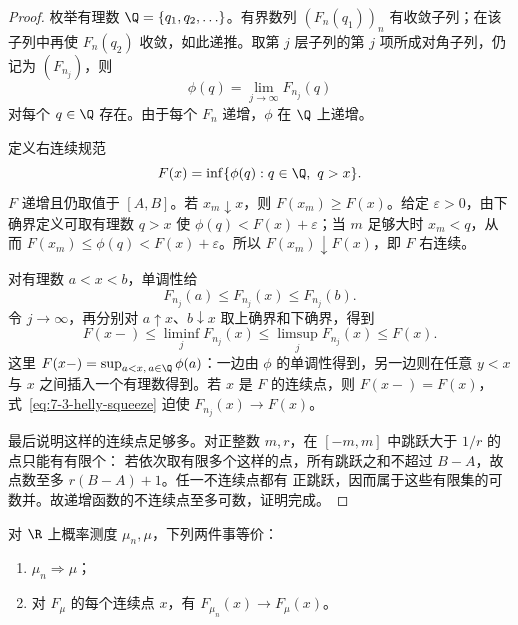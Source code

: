 \begin{proof}
枚举有理数 $\Q=\{q_1,q_2,\ldots\}$。有界数列 $(F_n(q_1))_n$ 有收敛子列；在该子列中再使
$F_n(q_2)$ 收敛，如此递推。取第 $j$ 层子列的第 $j$ 项所成对角子列，仍记为 $(F_{n_j})$，则
\[
 \phi(q)=\lim_{j\to\infty}F_{n_j}(q)
\]
对每个 $q\in\Q$ 存在。由于每个 $F_n$ 递增，$\phi$ 在 $\Q$ 上递增。

定义右连续规范
\begin{equation}\label{eq:7-3-helly-limit-definition}
 F(x)=\inf\{\phi(q):q\in\Q,\ q>x\}.
\end{equation}
$F$ 递增且仍取值于 $[A,B]$。若 $x_m\downarrow x$，则 $F(x_m)\geq F(x)$。给定
$\varepsilon>0$，由下确界定义可取有理数 $q>x$ 使
$\phi(q)<F(x)+\varepsilon$；当 $m$ 足够大时 $x_m<q$，从而
$F(x_m)\leq\phi(q)<F(x)+\varepsilon$。所以 $F(x_m)\downarrow F(x)$，即 $F$ 右连续。

对有理数 $a<x<b$，单调性给
\[
 F_{n_j}(a)\leq F_{n_j}(x)\leq F_{n_j}(b).
\]
令 $j\to\infty$，再分别对 $a\uparrow x$、$b\downarrow x$ 取上确界和下确界，得到
\begin{equation}\label{eq:7-3-helly-squeeze}
 F(x-)\leq\liminf_jF_{n_j}(x)
 \leq\limsup_jF_{n_j}(x)\leq F(x).
\end{equation}
这里
$F(x-)=\sup_{a<x,\,a\in\Q}\phi(a)$：一边由 $\phi$ 的单调性得到，另一边则在任意 $y<x$ 与
$x$ 之间插入一个有理数得到。若 $x$ 是 $F$ 的连续点，则 $F(x-)=F(x)$，
式~\eqref{eq:7-3-helly-squeeze} 迫使 $F_{n_j}(x)\to F(x)$。

最后说明这样的连续点足够多。对正整数 $m,r$，在 $[-m,m]$ 中跳跃大于 $1/r$ 的点只能有有限个：
若依次取有限多个这样的点，所有跳跃之和不超过 $B-A$，故点数至多 $r(B-A)+1$。任一不连续点都有
正跳跃，因而属于这些有限集的可数并。故递增函数的不连续点至多可数，证明完成。
\end{proof}

\begin{theorem}[分布函数判据]\label{theorem:7-3-2-2}
对 $\R$ 上概率测度 $\mu_n,\mu$，下列两件事等价：
\begin{enumerate}
  \item $\mu_n\Rightarrow\mu$；
  \item 对 $F_\mu$ 的每个连续点 $x$，有
  $F_{\mu_n}(x)\to F_\mu(x)$。
\end{enumerate}
\end{theorem}

